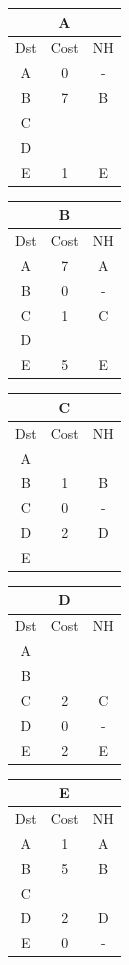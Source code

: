 \documentclass[10pt]{article}
\begin{document}
			\begin{table}[h!]
				\begin{tabular}{|c||c||c|}
					\hline
					\multicolumn{3}{|c|}{A} \\
					\hline
					Dst & Cost & NH \\
					\hline
					A & 0 & - \\
					B & 7 & B \\
					C &   &   \\
					D &   &   \\
					E & 1 & E \\
					\hline
				\end{tabular}
				\begin{tabular}{|c||c||c|}
					\hline
					\multicolumn{3}{|c|}{B} \\
					\hline
					Dst & Cost & NH \\
					\hline
					A & 7 & A \\
					B & 0 & - \\
					C & 1 & C \\
					D &   &   \\
					E & 5 & E \\
					\hline
				\end{tabular}
				\begin{tabular}{|c||c||c|}
					\hline
					\multicolumn{3}{|c|}{C} \\
					\hline
					Dst & Cost & NH \\
					\hline
					A &   &   \\
					B & 1 & B \\
					C & 0 & - \\
					D & 2 & D \\
					E &   &   \\
					\hline
				\end{tabular}
				\begin{tabular}{|c||c||c|}
					\hline
					\multicolumn{3}{|c|}{D} \\
					\hline
					Dst & Cost & NH \\
					\hline
					A &   &   \\
					B &   &   \\
					C & 2 & C \\
					D & 0 & - \\
					E & 2 & E \\
					\hline
				\end{tabular}
				\begin{tabular}{|c||c||c|}
					\hline
					\multicolumn{3}{|c|}{E} \\
					\hline
					Dst & Cost & NH \\
					\hline
					A & 1 & A \\
					B & 5 & B \\
					C &   &   \\
					D & 2 & D \\
					E & 0 & - \\
					\hline
				\end{tabular}
			\end{table}
\end{document}
